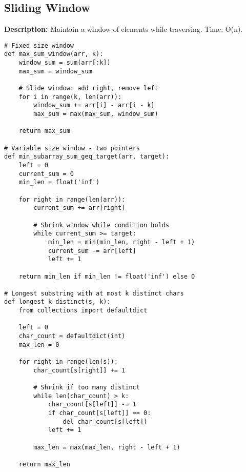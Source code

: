 \subsection{Sliding Window}
\textbf{Description:} Maintain a window of elements while traversing. Time: O(n).

\begin{lstlisting}
# Fixed size window
def max_sum_window(arr, k):
    window_sum = sum(arr[:k])
    max_sum = window_sum
    
    # Slide window: add right, remove left
    for i in range(k, len(arr)):
        window_sum += arr[i] - arr[i - k]
        max_sum = max(max_sum, window_sum)
    
    return max_sum

# Variable size window - two pointers
def min_subarray_sum_geq_target(arr, target):
    left = 0
    current_sum = 0
    min_len = float('inf')
    
    for right in range(len(arr)):
        current_sum += arr[right]
        
        # Shrink window while condition holds
        while current_sum >= target:
            min_len = min(min_len, right - left + 1)
            current_sum -= arr[left]
            left += 1
    
    return min_len if min_len != float('inf') else 0

# Longest substring with at most k distinct chars
def longest_k_distinct(s, k):
    from collections import defaultdict
    
    left = 0
    char_count = defaultdict(int)
    max_len = 0
    
    for right in range(len(s)):
        char_count[s[right]] += 1
        
        # Shrink if too many distinct
        while len(char_count) > k:
            char_count[s[left]] -= 1
            if char_count[s[left]] == 0:
                del char_count[s[left]]
            left += 1
        
        max_len = max(max_len, right - left + 1)
    
    return max_len
\end{lstlisting}
